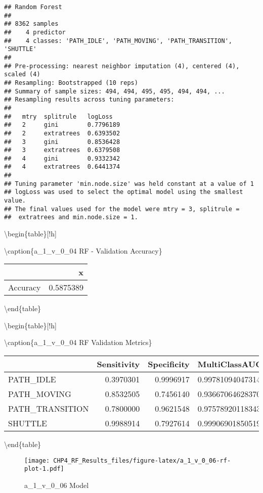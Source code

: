 \documentclass[]{article}
\begin{document}
\begin{verbatim}
## Random Forest 
## 
## 8362 samples
##    4 predictor
##    4 classes: 'PATH_IDLE', 'PATH_MOVING', 'PATH_TRANSITION', 'SHUTTLE' 
## 
## Pre-processing: nearest neighbor imputation (4), centered (4), scaled (4) 
## Resampling: Bootstrapped (10 reps) 
## Summary of sample sizes: 494, 494, 495, 495, 494, 494, ... 
## Resampling results across tuning parameters:
## 
##   mtry  splitrule   logLoss  
##   2     gini        0.7796189
##   2     extratrees  0.6393502
##   3     gini        0.8536428
##   3     extratrees  0.6379508
##   4     gini        0.9332342
##   4     extratrees  0.6441374
## 
## Tuning parameter 'min.node.size' was held constant at a value of 1
## logLoss was used to select the optimal model using the smallest value.
## The final values used for the model were mtry = 3, splitrule =
##  extratrees and min.node.size = 1.
\end{verbatim}

\textbackslash{}begin\{table\}{[}!h{]}

\textbackslash{}caption\{\label{tab:a_1_v_0_04-rf-params}a\_1\_v\_0\_04
RF - Validation Accuracy\} \centering

\begin{tabular}[t]{lr}
\toprule
  & x\\
\midrule
Accuracy & 0.5875389\\
\bottomrule
\end{tabular}

\textbackslash{}end\{table\}

\textbackslash{}begin\{table\}{[}!h{]}

\textbackslash{}caption\{\label{tab:a_1_v_0_04-rf-params}a\_1\_v\_0\_04
RF Validation Metrics\} \centering

\begin{tabular}[t]{lrrl}
\toprule
  & Sensitivity & Specificity & MultiClassAUC\\
\midrule
PATH\_IDLE & 0.3970301 & 0.9996917 & 0.997810940473145\\
PATH\_MOVING & 0.8532505 & 0.7456140 & 0.936670646283709\\
PATH\_TRANSITION & 0.7800000 & 0.9621548 & 0.975789201183432\\
SHUTTLE & 0.9988914 & 0.7927614 & 0.999069018505198\\
\bottomrule
\end{tabular}

\textbackslash{}end\{table\}

\begin{figure}
\centering
\texttt{[image: CHP4\_RF\_Results\_files/figure-latex/a\_1\_v\_0\_06-rf-plot-1.pdf]}
\caption{a\_1\_v\_0\_06 Model}
\end{figure}
\end{document}
